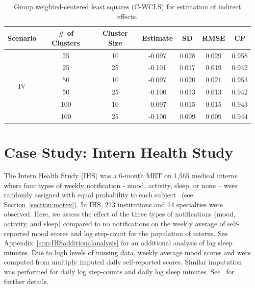 \documentclass[12pt]{article}
\begin{document}
\begin{table}[!th]
\centering
\begin{tabular}{c | cccccc}
\hline
Scenario & \# of Clusters & Cluster Size & Estimate & SD & RMSE & CP \\ \hline
\multirow{6}{*}{IV} & 25 & 10 & -0.097 & 0.028 & 0.029 & 0.958 \\
& 25 & 25 & -0.101 & 0.017 &  0.019 & 0.942 \\
& 50 & 10 & -0.097 & 0.020 & 0.021 & 0.953 \\
& 50 & 25 & -0.100 & 0.013 & 0.013 & 0.942 \\
& 100 & 10 & -0.097 & 0.015 & 0.015 & 0.943 \\
& 100 & 25 &  -0.100 & 0.009 & 0.009 & 0.944 \\ \hline
\end{tabular}
\caption{Group weighted-centered least squares (C-WCLS) for estimation of indirect effects.}
\label{tab:simresults_indirect}

\end{table}

\section{Case Study: Intern Health Study}
\label{section:casestudy}

The Intern Health Study (IHS) was a 6-month MRT on 1,565 medical interns where four types of weekly notification - mood, activity, sleep, or none -- were randomly assigned with equal probability to each subject~\cite{Necamp2020} (see Section~\ref{section:motex}).
In IHS,  273 institutions and 14 specialties were observed.   Here, we assess the effect of the three types of notifications (mood, activity, and sleep) compared to no notifications on the weekly average of self-reported mood scores and log step-count  for the population of interns.  See Appendix~\ref{app:IHSadditionalanalysis} for an additional analysis of log sleep minutes.  Due to high levels of missing data, weekly average mood scores and were computed from multiply imputed daily self-reported scores.  Similar imputation was performed for daily log step-counts and daily log sleep minutes. See~\cite{Necamp2020} for further details.
\end{document}
